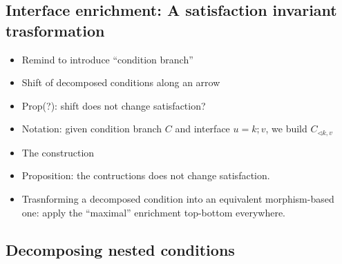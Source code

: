 \subsection{Interface enrichment: A satisfaction invariant trasformation}

\begin{itemize}
  \item Remind to introduce ``condition branch''
  \item Shift of decomposed conditions along an arrow
  \item Prop(?): shift does not change satisfaction?
  \item Notation: given condition branch $C$ and interface $u = k;v$, we build $C_{\triangleleft k, v}$
  \item The construction
  \item Proposition: the contructions does not change satisfaction.
  \item Trasnforming a decomposed condition into an equivalent morphism-based one: apply the ``maximal'' enrichment top-bottom everywhere.
\end{itemize}  


\subsection{Decomposing nested conditions}





